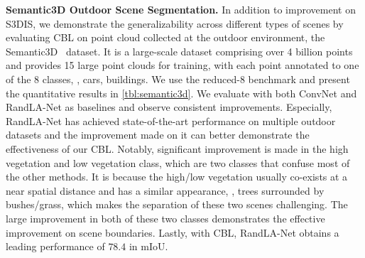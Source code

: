 \documentclass[10pt,twocolumn,letterpaper]{article}
\begin{document}
\noindent\textbf{Semantic3D Outdoor Scene Segmentation.}
In addition to improvement on S3DIS\cite{s3dis}, we demonstrate the generalizability across different types of scenes by evaluating CBL on point cloud collected at the outdoor environment, the Semantic3D~\cite{semantic3d} dataset. It is a large-scale dataset comprising over 4 billion points and provides 15 large point clouds for training, with each point annotated to one of the 8 classes, \eg, cars, buildings.
We use the reduced-8 benchmark and present the quantitative results in \cref{tbl:semantic3d}. We evaluate with both ConvNet and RandLA-Net\cite{randlanet} as baselines and observe consistent improvements. Especially, RandLA-Net has achieved state-of-the-art performance on multiple outdoor datasets and the improvement made on it can better demonstrate the effectiveness of our CBL. Notably, significant improvement is made in the high vegetation and low vegetation class, which are two classes that confuse most of the other methods. It is because the high/low vegetation usually co-exists at a near spatial distance and has a similar appearance, \eg, trees surrounded by bushes/grass, which makes the separation of these two scenes challenging. The large improvement in both of these two classes demonstrates the effective improvement on scene boundaries. Lastly, with CBL, RandLA-Net obtains a leading performance of $78.4$ in mIoU.
\end{document}

